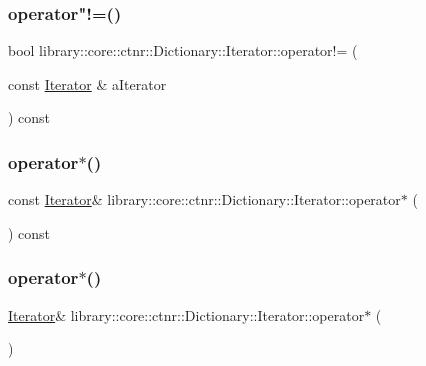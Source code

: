 \subsubsection{\texorpdfstring{operator"!=()}{operator!=()}}
{\footnotesize\ttfamily bool library\+::core\+::ctnr\+::\+Dictionary\+::\+Iterator\+::operator!= (\begin{DoxyParamCaption}\item[{const \hyperlink{classlibrary_1_1core_1_1ctnr_1_1_dictionary_1_1_iterator}{Iterator} \&}]{a\+Iterator }\end{DoxyParamCaption}) const}

\mbox{\label{classlibrary_1_1core_1_1ctnr_1_1_dictionary_1_1_iterator_ab162ab9f80c90a75c30d5c23b4343f11}} 
\subsubsection{\texorpdfstring{operator$\ast$()}{operator*()}\hspace{0.1cm}{\footnotesize\ttfamily [1/2]}}
{\footnotesize\ttfamily const \hyperlink{classlibrary_1_1core_1_1ctnr_1_1_dictionary_1_1_iterator}{Iterator}\& library\+::core\+::ctnr\+::\+Dictionary\+::\+Iterator\+::operator$\ast$ (\begin{DoxyParamCaption}{ }\end{DoxyParamCaption}) const}

\mbox{\label{classlibrary_1_1core_1_1ctnr_1_1_dictionary_1_1_iterator_a948d120f6e384f2567a000f356ff80b7}} 
\subsubsection{\texorpdfstring{operator$\ast$()}{operator*()}\hspace{0.1cm}{\footnotesize\ttfamily [2/2]}}
{\footnotesize\ttfamily \hyperlink{classlibrary_1_1core_1_1ctnr_1_1_dictionary_1_1_iterator}{Iterator}\& library\+::core\+::ctnr\+::\+Dictionary\+::\+Iterator\+::operator$\ast$ (\begin{DoxyParamCaption}{ }\end{DoxyParamCaption})}


